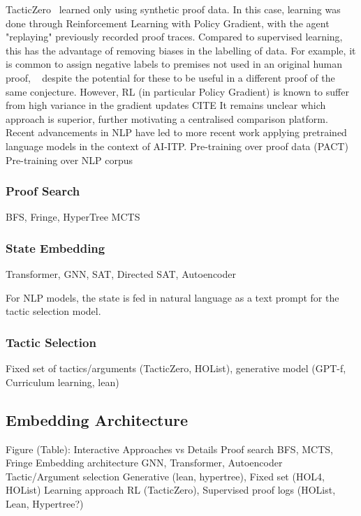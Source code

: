 \documentclass[letterpaper]{article} %
\begin{document}
    TacticZero~\cite{wu_tacticzero_2021} learned only using synthetic proof data.
    In this case, learning was done through Reinforcement Learning with Policy Gradient,
    with the agent "replaying" previously recorded proof traces.
    Compared to supervised learning, this has the advantage of removing biases in the labelling of data.
    For example, it is common to assign negative labels to premises not used in an original human proof,
    ~\cite{kaliszyk_holstep_2017, kaliszyk_mizar_2015, bansal_holist_2019}
    despite the potential for these to be useful in a different proof of the same conjecture.
    However, RL (in particular Policy Gradient) is known to suffer from high variance in the gradient updates CITE
    It remains unclear which approach is superior, further motivating a centralised comparison platform. \\

    Recent advancements in NLP have led to more recent work applying pretrained language models in the context of AI-ITP.
    Pre-training over proof data (PACT)
    Pre-training over NLP corpus

    \subsubsection{Proof Search}
    BFS, Fringe, HyperTree MCTS

    \subsubsection{State Embedding}
    Transformer, GNN, SAT, Directed SAT, Autoencoder

    For NLP models, the state is fed in natural language as a text prompt for the tactic selection model.

    \subsubsection{Tactic Selection}
    Fixed set of tactics/arguments (TacticZero, HOList), generative model (GPT-f, Curriculum learning, lean)

    \subsection{Embedding Architecture}

    Figure (Table):
    Interactive Approaches vs Details
    Proof search
    BFS, MCTS, Fringe
    Embedding architecture
    GNN, Transformer, Autoencoder
    Tactic/Argument selection
    Generative (lean, hypertree), Fixed set (HOL4, HOList)
    Learning approach
    RL (TacticZero), Supervised proof logs (HOList, Lean, Hypertree?)
\end{document}
